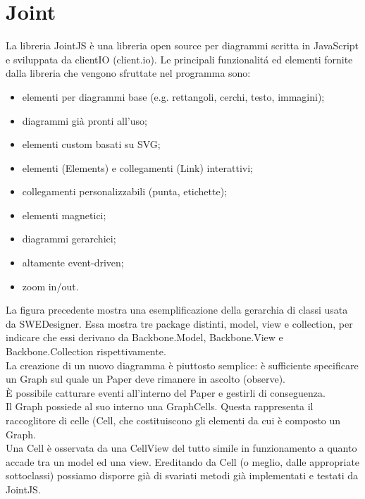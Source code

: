 \documentclass[../SpecificaTecnica.tex]{subfiles}
\begin{document}
	\section{Joint}
La libreria JointJS è una libreria open source per diagrammi scritta in JavaScript e sviluppata
da clientIO (client.io).
Le principali funzionalit\'a ed elementi fornite dalla libreria che vengono sfruttate nel programma sono:
\begin{itemize}
\item elementi per diagrammi base (e.g. rettangoli, cerchi, testo, immagini);
\item diagrammi già pronti all’uso;
\item elementi custom basati su SVG;
\item elementi (Elements) e collegamenti (Link) interattivi;
\item collegamenti personalizzabili (punta, etichette);
\item elementi magnetici;
\item diagrammi gerarchici;
\item altamente event-driven;
\item zoom in/out.
\end{itemize}

La figura precedente mostra una esemplificazione della gerarchia di classi usata da SWEDesigner. Essa mostra tre package distinti, model, view e collection, per indicare che essi derivano da Backbone.Model, Backbone.View e
Backbone.Collection rispettivamente.\\
La creazione di un nuovo diagramma è piuttosto semplice: è sufficiente specificare un Graph sul quale un Paper deve rimanere in ascolto (observe).\\
È possibile catturare eventi all’interno del Paper e gestirli di conseguenza.\\
Il Graph possiede al suo interno una GraphCells. Questa rappresenta il raccoglitore di celle (Cell, che costituiscono gli elementi da cui è composto un Graph.\\
Una Cell è osservata da una CellView del tutto simile in funzionamento a quanto accade tra un model ed una view.
Ereditando da Cell (o meglio, dalle appropriate sottoclassi) possiamo disporre già di svariati metodi già implementati e testati da JointJS.
\end{document}
